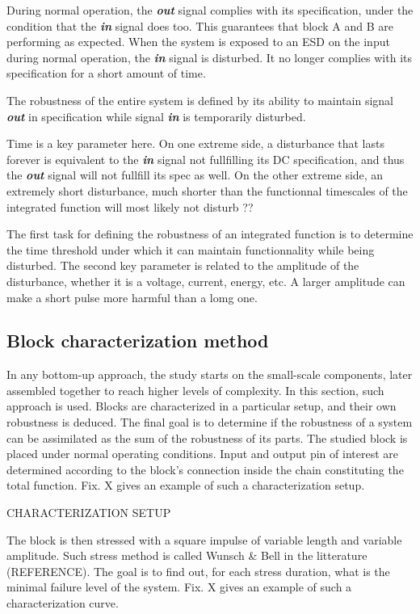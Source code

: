 During normal operation, the \textbf{\textit{out}} signal complies with its specification,
under the condition that the \textbf{\textit{in}} signal does too.
This guarantees that block A and B are performing as expected.
When the system is exposed to an ESD on the input during normal operation, the \textbf{\textit{in}} signal is disturbed.
It no longer complies with its specification for a short amount of time.

The robustness of the entire system is defined by its ability to maintain signal \textbf{\textit{out}} in specification
while signal \textbf{\textit{in}} is temporarily disturbed.

Time is a key parameter here. On one extreme side, a disturbance that lasts forever is equivalent to the \textbf{\textit{in}} signal not fullfilling its DC specification,
and thus the \textbf{\textit{out}} signal will not fullfill its spec as well.
On the other extreme side, an extremely short disturbance, much shorter than the functionnal timescales of the integrated function will most likely not disturb ??

The first task for defining the robustness of an integrated function is to determine the time threshold under which it can maintain functionnality while being disturbed.
The second key parameter is related to the amplitude of the disturbance, whether it is a voltage, current, energy, etc.
A larger amplitude can make a short pulse more harmful than a lomg one.

\subsection{Block characterization method}
In any bottom-up approach, the study starts on the small-scale components, later assembled together to reach higher levels of complexity.
In this section, such approach is used.
Blocks are characterized in a particular setup, and their own robustness is deduced. The final goal is to determine if the robustness of
a system can be assimilated as the sum of the robustness of its parts.
The studied block is placed under normal operating conditions.
Input and output pin of interest are determined according to the block's connection inside the chain constituting the total function.
Fix. X gives an example of such a characterization setup.

CHARACTERIZATION SETUP

The block is then stressed with a square impulse of variable length and variable amplitude.
Such stress method is called Wunsch & Bell in the litterature (REFERENCE).
The goal is to find out, for each stress duration, what is the minimal failure level of the system.
Fix. X gives an example of such a characterization curve.

